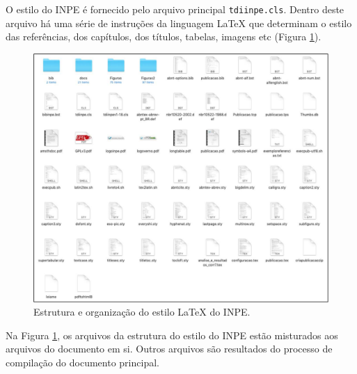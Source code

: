 O estilo do INPE é fornecido pelo arquivo principal {\tt tdiinpe.cls}. Dentro deste arquivo há uma série de instruções da linguagem \LaTeX{} que determinam o estilo das referências, dos capítulos, dos títulos, tabelas, imagens etc (Figura \ref{fig:estrut}).


\begin{figure}[H]
\caption{Estrutura e organização do estilo \LaTeX{} do INPE.}
\vspace{6mm}
    \begin{center}
        \includegraphics[scale=0.3]{./docs/figs/estrutura_estilo_inpe.pdf}
    \end{center}
\vspace{4mm}
\label{fig:estrut}
\end{figure}

Na Figura \ref{fig:estrut}, os arquivos da estrutura do estilo do INPE estão misturados aos arquivos do documento em si. Outros arquivos são resultados do processo de compilação do documento principal. 


